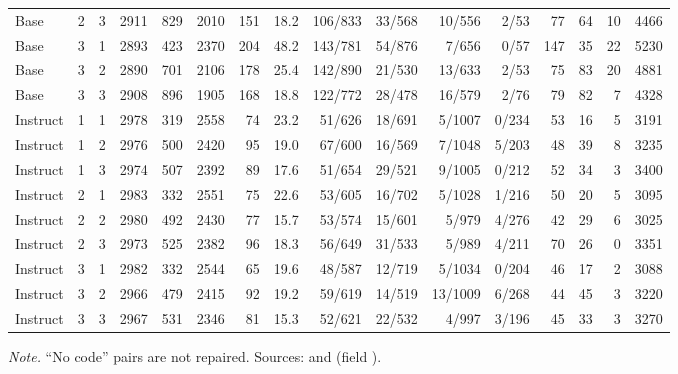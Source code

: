 \begin{landscape}
{\begin{longtable}{@{}lccrrrrrrrrrrrrr@{}}
Base & 2 & 3 & 2911 & 829 & 2010 & 151 & 18.2 & 106/833 & 33/568 & 10/556 & 2/53 & 77 & 64 & 10 & 4466\\
Base & 3 & 1 & 2893 & 423 & 2370 & 204 & 48.2 & 143/781 & 54/876 & 7/656 & 0/57 & 147 & 35 & 22 & 5230\\
Base & 3 & 2 & 2890 & 701 & 2106 & 178 & 25.4 & 142/890 & 21/530 & 13/633 & 2/53 & 75 & 83 & 20 & 4881\\
Base & 3 & 3 & 2908 & 896 & 1905 & 168 & 18.8 & 122/772 & 28/478 & 16/579 & 2/76 & 79 & 82 & 7 & 4328\\
Instruct & 1 & 1 & 2978 & 319 & 2558 & 74 & 23.2 & 51/626 & 18/691 & 5/1007 & 0/234 & 53 & 16 & 5 & 3191\\
Instruct & 1 & 2 & 2976 & 500 & 2420 & 95 & 19.0 & 67/600 & 16/569 & 7/1048 & 5/203 & 48 & 39 & 8 & 3235\\
Instruct & 1 & 3 & 2974 & 507 & 2392 & 89 & 17.6 & 51/654 & 29/521 & 9/1005 & 0/212 & 52 & 34 & 3 & 3400\\
Instruct & 2 & 1 & 2983 & 332 & 2551 & 75 & 22.6 & 53/605 & 16/702 & 5/1028 & 1/216 & 50 & 20 & 5 & 3095\\
Instruct & 2 & 2 & 2980 & 492 & 2430 & 77 & 15.7 & 53/574 & 15/601 & 5/979 & 4/276 & 42 & 29 & 6 & 3025\\
Instruct & 2 & 3 & 2973 & 525 & 2382 & 96 & 18.3 & 56/649 & 31/533 & 5/989 & 4/211 & 70 & 26 & 0 & 3351\\
Instruct & 3 & 1 & 2982 & 332 & 2544 & 65 & 19.6 & 48/587 & 12/719 & 5/1034 & 0/204 & 46 & 17 & 2 & 3088\\
Instruct & 3 & 2 & 2966 & 479 & 2415 & 92 & 19.2 & 59/619 & 14/519 & 13/1009 & 6/268 & 44 & 45 & 3 & 3220\\
Instruct & 3 & 3 & 2967 & 531 & 2346 & 81 & 15.3 & 52/621 & 22/532 & 4/997 & 3/196 & 45 & 33 & 3 & 3270\\
\end{longtable}
}
\vspace{-0.6\baselineskip}
{\footnotesize\color{slate}\textit{Note.} ``No code'' pairs are not repaired. Sources:  and  (field ).\par}
\medskip
\end{landscape}
